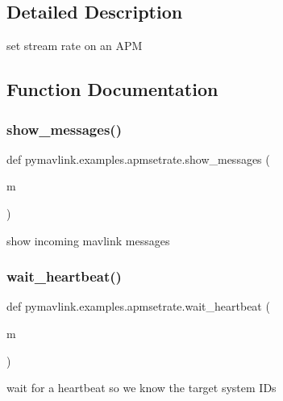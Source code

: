 \subsection{Detailed Description}
\begin{DoxyVerb}set stream rate on an APM
\end{DoxyVerb}
 

\subsection{Function Documentation}
\mbox{\label{namespacepymavlink_1_1examples_1_1apmsetrate_a81e07c39f713646c60c7a22474c50b3f}} 
\subsubsection{\texorpdfstring{show\+\_\+messages()}{show\_messages()}}
{\footnotesize\ttfamily def pymavlink.\+examples.\+apmsetrate.\+show\+\_\+messages (\begin{DoxyParamCaption}\item[{}]{m }\end{DoxyParamCaption})}

\begin{DoxyVerb}show incoming mavlink messages\end{DoxyVerb}
 \mbox{\label{namespacepymavlink_1_1examples_1_1apmsetrate_a7411701774159f385cda1fd908922db8}} 
\subsubsection{\texorpdfstring{wait\+\_\+heartbeat()}{wait\_heartbeat()}}
{\footnotesize\ttfamily def pymavlink.\+examples.\+apmsetrate.\+wait\+\_\+heartbeat (\begin{DoxyParamCaption}\item[{}]{m }\end{DoxyParamCaption})}

\begin{DoxyVerb}wait for a heartbeat so we know the target system IDs\end{DoxyVerb}
 